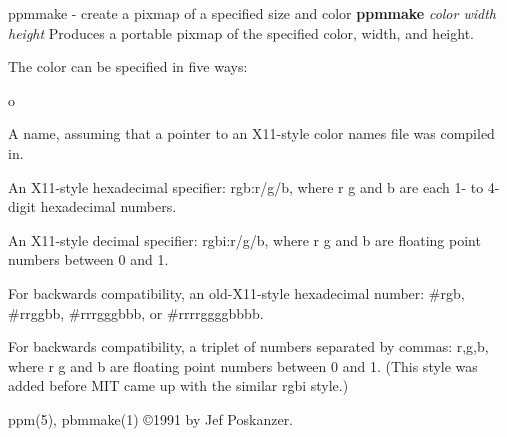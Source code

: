 %

\newpage
%

ppmmake - create a pixmap of a specified size and color
{\bf ppmmake}
{\it color width height}
Produces a portable pixmap of the specified color, width, and height.
\par
The color can be specified in five ways:
\begin{TPlist}{o}
\item[{o}]
A name, assuming
that a pointer to an X11-style color names file was compiled in.
\item[{o}]
An X11-style hexadecimal specifier: rgb:r/g/b, where r g and b are
each 1- to 4-digit hexadecimal numbers.
\item[{o}]
An X11-style decimal specifier: rgbi:r/g/b, where r g and b are
floating point numbers between 0 and 1.
\item[{o}]
For backwards compatibility, an old-X11-style hexadecimal
number: \#rgb, \#rrggbb, \#rrrgggbbb, or \#rrrrggggbbbb.
\item[{o}]
For backwards compatibility, a triplet of numbers
separated by commas: r,g,b, where r g and b are
floating point numbers between 0 and 1.
(This style was added before MIT came up with the similar rgbi style.)
\end{TPlist}

ppm(5), pbmmake(1)
\copyright 1991 by Jef Poskanzer.
%
 
%

